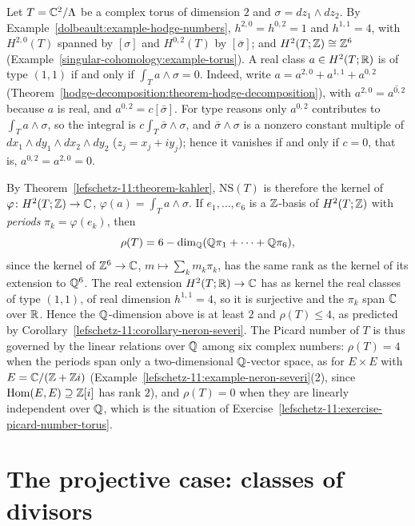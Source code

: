 \begin{example}\label{lefschetz-11:example-two-torus}
Let $T = \mathbb{C}^2/\Lambda$ be a complex torus of dimension $2$ and $\sigma = dz_1 \wedge dz_2$. By Example~\ref{dolbeault:example-hodge-numbers}, $h^{2,0} = h^{0,2} = 1$ and $h^{1,1} = 4$, with $H^{2,0}(T)$
spanned by $[\sigma]$ and $H^{0,2}(T)$ by $[\bar\sigma]$; and $H^2(T; \mathbb{Z}) \cong \mathbb{Z}^6$ (Example~\ref{singular-cohomology:example-torus}). A real class $a \in H^2(T; \mathbb{R})$ is of type $(1,1)$ if and only if
$\int_Ta \wedge \sigma = 0$. Indeed, write $a = a^{2,0} + a^{1,1} + a^{0,2}$ (Theorem~\ref{hodge-decomposition:theorem-hodge-decomposition}), with $a^{2,0} = \overline{a^{0,2}}$ because $a$ is real, and
$a^{0,2} = c[\bar\sigma]$. For type reasons only $a^{0,2}$ contributes to $\int_Ta \wedge \sigma$, so the integral is $c\int_T\bar\sigma \wedge \sigma$, and $\bar\sigma \wedge \sigma$ is a nonzero constant
multiple of $dx_1 \wedge dy_1 \wedge dx_2 \wedge dy_2$ ($z_j = x_j + iy_j$); hence it vanishes if and only if $c = 0$, that is, $a^{0,2} = a^{2,0} = 0$.

By Theorem~\ref{lefschetz-11:theorem-kahler}, $\mathrm{NS}(T)$ is therefore the kernel of $\varphi \colon H^2(T; \mathbb{Z}) \to \mathbb{C}$, $\varphi(a) = \int_Ta \wedge \sigma$. If $e_1, \ldots, e_6$ is a $\mathbb{Z}$-basis of
$H^2(T; \mathbb{Z})$ with \emph{periods} $\pi_k = \varphi(e_k)$, then
\[
\rho(T) = 6 - \dim_{\mathbb{Q}}(\mathbb{Q}\pi_1 + \cdots + \mathbb{Q}\pi_6),
\]
since the kernel of $\mathbb{Z}^6 \to \mathbb{C}$, $m \mapsto \sum_km_k\pi_k$, has the same rank as the kernel of its extension to $\mathbb{Q}^6$. The real extension $H^2(T; \mathbb{R}) \to \mathbb{C}$ has as kernel the real classes of type
$(1,1)$, of real dimension $h^{1,1} = 4$, so it is surjective and the $\pi_k$ span $\mathbb{C}$ over $\mathbb{R}$. Hence the $\mathbb{Q}$-dimension above is at least $2$ and $\rho(T) \leq 4$, as predicted by
Corollary~\ref{lefschetz-11:corollary-neron-severi}. The Picard number of $T$ is thus governed by the linear relations over $\mathbb{Q}$ among six complex numbers: $\rho(T) = 4$ when the periods span only a
two-dimensional $\mathbb{Q}$-vector space, as for $E \times E$ with $E = \mathbb{C}/(\mathbb{Z} + \mathbb{Z} i)$ (Example~\ref{lefschetz-11:example-neron-severi}(2), since $\operatorname{Hom}(E, E) \supseteq \mathbb{Z}[i]$ has rank $2$), and
$\rho(T) = 0$ when they are linearly independent over $\mathbb{Q}$, which is the situation of Exercise~\ref{lefschetz-11:exercise-picard-number-torus}.
\end{example}

\section{The projective case: classes of divisors}\label{lefschetz-11:section-projective}

